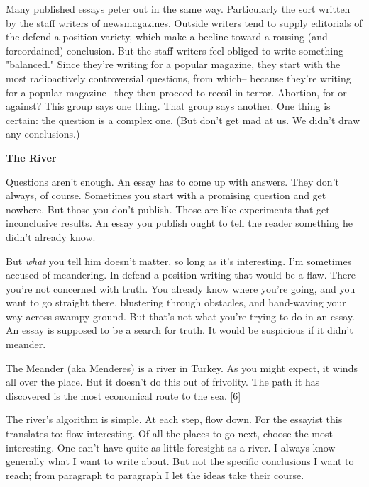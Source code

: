 Many published
                  essays peter out in the same way. Particularly the sort
                  written by the staff writers of newsmagazines. Outside writers
                  tend to supply editorials of the defend-a-position variety,
                  which make a beeline toward a rousing (and foreordained)
                  conclusion. But the staff writers feel obliged to write
                  something "balanced." Since they're writing for a popular
                  magazine, they start with the most radioactively controversial
                  questions, from which-- because they're writing for a popular
                  magazine-- they then proceed to recoil in terror. Abortion,
                  for or against? This group says one thing. That group says
                  another. One thing is certain: the question is a complex one.
                  (But don't get mad at us. We didn't draw any conclusions.)

\textbf{The River}

Questions aren't enough. An essay has to come up
                  with answers. They don't always, of course. Sometimes you
                  start with a promising question and get nowhere. But those you
                  don't publish. Those are like experiments that get
                  inconclusive results. An essay you publish ought to tell the
                  reader something he didn't already know.

But
                  \emph{what} you tell him doesn't matter, so long as it's
                  interesting. I'm sometimes accused of meandering. In
                  defend-a-position writing that would be a flaw. There you're
                  not concerned with truth. You already know where you're going,
                  and you want to go straight there, blustering through
                  obstacles, and hand-waving your way across swampy ground. But
                  that's not what you're trying to do in an essay. An essay is
                  supposed to be a search for truth. It would be suspicious if
                  it didn't meander.

The Meander (aka Menderes) is a
                  river in Turkey. As you might expect, it winds all over the
                  place. But it doesn't do this out of frivolity. The path it
                  has discovered is the most economical route to the sea. [6]

The
                  river's algorithm is simple. At each step, flow down. For the
                  essayist this translates to: flow interesting. Of all the
                  places to go next, choose the most interesting. One can't have
                  quite as little foresight as a river. I always know generally
                  what I want to write about. But not the specific conclusions I
                  want to reach; from paragraph to paragraph I let the ideas
                  take their course.

